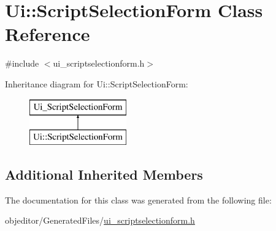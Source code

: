 \hypertarget{class_ui_1_1_script_selection_form}{}\section{Ui\+::Script\+Selection\+Form Class Reference}
\label{class_ui_1_1_script_selection_form}


{\ttfamily \#include $<$ui\+\_\+scriptselectionform.\+h$>$}

Inheritance diagram for Ui\+::Script\+Selection\+Form\+:\begin{figure}[H]
\begin{center}
\leavevmode
\includegraphics[height=2.000000cm]{d6/d73/class_ui_1_1_script_selection_form}
\end{center}
\end{figure}
\subsection*{Additional Inherited Members}


The documentation for this class was generated from the following file\+:\begin{DoxyCompactItemize}
\item 
objeditor/\+Generated\+Files/\mbox{\hyperlink{ui__scriptselectionform_8h}{ui\+\_\+scriptselectionform.\+h}}\end{DoxyCompactItemize}
